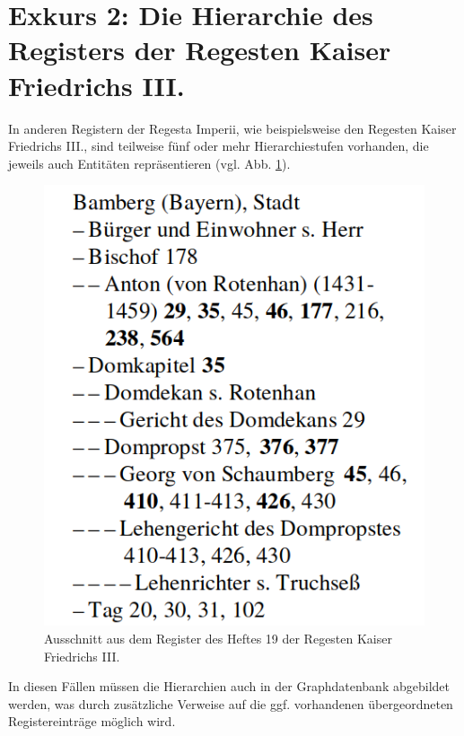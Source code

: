 \documentclass[ngerman,]{scrreprt}
\begin{document}
\hypertarget{exkurs-2-die-hierarchie-des-registers-der-regesten-kaiser-friedrichs-iii.}{%
\section{Exkurs 2: Die Hierarchie des Registers der Regesten Kaiser Friedrichs III.}\label{exkurs-2-die-hierarchie-des-registers-der-regesten-kaiser-friedrichs-iii.}}

In anderen Registern der Regesta Imperii, wie beispielsweise den Regesten Kaiser Friedrichs III., sind teilweise fünf oder mehr Hierarchiestufen vorhanden, die jeweils auch Entitäten repräsentieren (vgl. Abb. \ref{registerbamberg}).

\begin{figure}
\centering
\includegraphics{Bilder/RI2Graph/ReggF3-Registerhierarchie.png}
\caption{Ausschnitt aus dem Register des Heftes 19 der Regesten Kaiser Friedrichs III.}
\label{registerbamberg}
\end{figure}

In diesen Fällen müssen die Hierarchien auch in der Graphdatenbank abgebildet werden, was durch zusätzliche Verweise auf die ggf. vorhandenen übergeordneten Registereinträge möglich wird.
\end{document}
